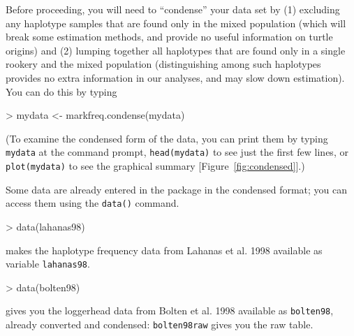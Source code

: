 \documentclass[11pt]{article}
\begin{document}
Before proceeding, you will need to ``condense'' your data
set by (1) excluding any haplotype samples that are found only in the
mixed population (which will break some estimation methods, and
provide no useful information on turtle origins) and (2) lumping
together all haplotypes that are found only in a single rookery and
the mixed population (distinguishing among such haplotypes provides no
extra information in our analyses, and may slow down estimation).
You can do this by typing
\begin{Schunk}
\begin{Sinput}
> mydata <- markfreq.condense(mydata)
\end{Sinput}
\end{Schunk}
(To examine the condensed form of the data,
you can print them by typing \verb+mydata+ at
the command prompt, \verb+head(mydata)+ to see
just the first few lines, or \verb+plot(mydata)+ to see
the graphical summary [Figure~\ref{fig:condensed}].)

Some data are already entered in the package
in the condensed format; you can access them
using the {\tt data()} command.
\begin{Schunk}
\begin{Sinput}
> data(lahanas98)
\end{Sinput}
\end{Schunk}
makes the haplotype frequency data from Lahanas et al. 1998
\cite{Laha+98} available as variable {\tt lahanas98}.
\begin{Schunk}
\begin{Sinput}
> data(bolten98)
\end{Sinput}
\end{Schunk}
gives you the loggerhead data from Bolten et al. 1998
\cite{Bolt+98} available as {\tt bolten98},
already converted and condensed: {\tt bolten98raw}
gives you the raw table.
\end{document}
